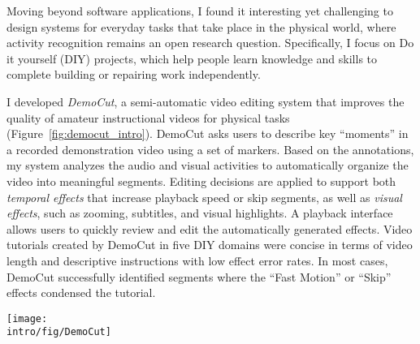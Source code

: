 
Moving beyond software applications, I found it interesting yet challenging to design systems for everyday tasks that take place in the physical world, where activity recognition remains an open research question.
%
Specifically, I focus on Do it yourself (DIY) projects, which help people learn knowledge and skills to complete building or repairing work independently.

I developed \emph{DemoCut}, a semi-automatic video editing system that improves the quality of amateur instructional videos for physical tasks (Figure~\ref{fig:democut_intro}). DemoCut asks users to describe key ``moments'' in a recorded demonstration video using a set of markers. Based on the annotations, my system analyzes the audio and visual activities to automatically organize the video into meaningful segments. Editing decisions are applied to support both \emph{temporal effects} that increase playback speed or skip segments, as well as \emph{visual effects}, such as zooming, subtitles, and visual highlights. A playback interface allows users to quickly review and edit the automatically generated effects.
%
Video tutorials created by DemoCut in five DIY domains were concise in terms of video length and descriptive instructions with low effect error rates. In most cases, DemoCut successfully identified segments where the ``Fast Motion'' or ``Skip'' effects condensed the tutorial.


\begin{figure*}[t]
  \centering
  \texttt{[image: \\intro/fig/DemoCut]}
  \caption{DemoCut asks users to mark key moments in a recorded video of demonstration using a set of marker types. Based on marker information, the system uses audio and video analysis to automatically organize the video into meaningful segments and apply appropriate video editing effects. A playback UI provides lightweight editing for authors to review and modify automatic results.}
  \label{fig:democut_intro}
\end{figure*}

